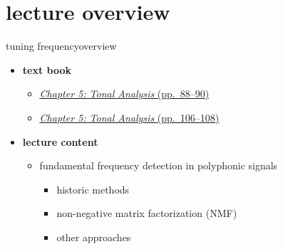 

\subtitle{Part 6.5: Tuning Frequency Estimation}


	

    \section[overview]{lecture overview}
        \begin{frame}{tuning frequency}{overview}
            \begin{itemize}
                \item   \textbf{text book}  
                    \begin{itemize}
                        \item   \href{http://ieeexplore.ieee.org/xpl/articleDetails.jsp?tp=&arnumber=6331122&}{\underline{\textit{Chapter 5: Tonal Analysis} (pp.~88--90)}}
                        \item   \href{http://ieeexplore.ieee.org/xpl/articleDetails.jsp?tp=&arnumber=6331122&}{\underline{\textit{Chapter 5: Tonal Analysis} (pp.~106--108)}}
                    \end{itemize}
                \bigskip
                \item<2->   \textbf{lecture content}
                    \begin{itemize}
                        \item<2->   fundamental frequency detection in polyphonic signals
                            \begin{itemize}
                                \item   historic methods
                                \item   non-negative matrix factorization (NMF)
                                \item   other approaches
                            \end{itemize}
                    \end{itemize}
            \end{itemize}
        \end{frame}

